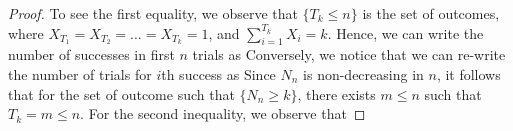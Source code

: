 \documentclass[a4paper,10pt,english]{article}
\begin{document}
\begin{proof}
To see the first equality, we observe that $\{T_k \leq n\}$ is the set of outcomes, 
where $X_{T_1} = X_{T_2} = \dots = X_{T_k} = 1$, and $\sum_{i=1}^{T_k}X_i = k$. 
Hence, we can write the number of successes in first $n$ trials as 
Conversely, we notice that we can re-write the number of trials for $i$th success as  
Since $N_n$ is non-decreasing in $n$, it follows that for the set of outcome such that $\{N_n \geq k\}$, there exists $m \leq n$ such that $T_k = m \leq n$. 
For the second inequality, we observe that
\end{proof}
\end{document}
